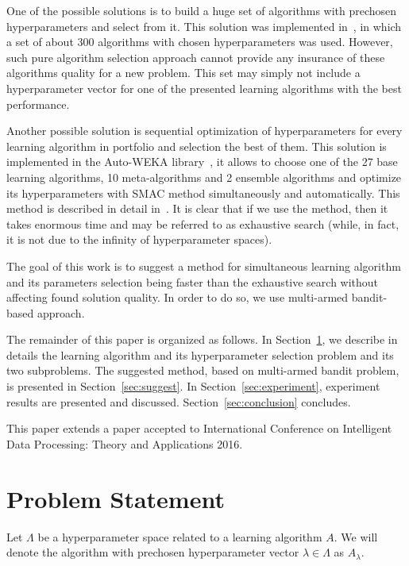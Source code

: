 \documentclass{svproc}
\begin{document}
One of the possible solutions is to build a huge set of algorithms with prechosen hyperparameters and select from it. This solution was implemented in~\cite{cashmeta1}, in which a set of about 300 algorithms with chosen hyperparameters was used. However, such pure algorithm selection approach cannot provide any insurance of these algorithms quality for a new problem. This set may simply not include a hyperparameter vector for one of the presented learning algorithms with the best performance.

Another possible solution is sequential optimization of hyperparameters for every learning algorithm in portfolio and selection the best of them. This solution is implemented in the Auto-WEKA library~\cite{autowekap}, it allows to choose one of the 27 base learning algorithms, 10 meta-algorithms and 2 ensemble algorithms and optimize its hyperparameters with SMAC method simultaneously and automatically. This method is described in detail in~\cite{autowekap}. It is clear that if we use the method, then it takes enormous time and may be referred to as exhaustive search (while, in fact, it is not due to the infinity of hyperparameter spaces).

The goal of this work is to suggest a method for simultaneous learning algorithm and its parameters selection being faster than the exhaustive search without affecting found solution quality. In order to do so, we use multi-armed bandit-based approach.

The remainder of this paper is organized as follows. In Section~\ref{sec:problem}, we describe in details the learning algorithm and its hyperparameter selection problem and its two subproblems. The suggested method, based on multi-armed bandit problem, is presented in Section~\ref{sec:suggest}. In Section~\ref{sec:experiment}, experiment results are presented and discussed. Section~\ref{sec:conclusion} concludes.

This paper extends a paper accepted to International Conference on Intelligent Data Processing: Theory and Applications 2016.

\section{Problem Statement}
\label{sec:problem}

Let $\Lambda$ be a hyperparameter space related to a learning algorithm $A$. We will denote the algorithm with prechosen hyperparameter vector $\lambda \in \Lambda$ as $A_{\lambda}$.
\end{document}
